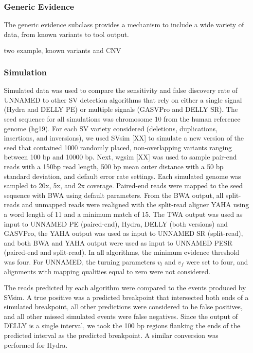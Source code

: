 \documentclass[11pt]{article}
\begin{document}


\subsubsection{Generic Evidence}

The generic evidence subclass provides a mechanism to include a wide variety of
data, from known variants to tool output.

two example, known variants and CNV

\subsubsection{Simulation}

Simulated data was used to compare the sensitivity and false discovery rate of
UNNAMED to other SV detection algorithms that rely on either a single signal
(Hydra and DELLY PE) or multiple signals (GASVPro and DELLY SR).  The seed
sequence for all simulations was chromosome 10 from the human reference genome
(hg19).  For each SV variety considered (deletions, duplications, insertions,
and inversions), we used SVsim [XX] to simulate a new version of the seed that
contained 1000 randomly placed, non-overlapping variants ranging between 100 bp
and 10000 bp. Next, wgsim [XX] was used to sample pair-end reads with a 150bp
read length, 500 bp mean outer distance with a 50 bp standard deviation, and
default error rate settings.  Each simulated genome was sampled to 20x, 5x, and
2x coverage. Paired-end reads were mapped to the seed sequence with BWA using
default parameters.  From the BWA output, all split-reads and unmapped reads
were realigned with the split-read aligner YAHA using a word length of 11 and a
minimum match of 15. The TWA output was used as input to UNNAMED PE
(paired-end), Hydra, DELLY (both versions) and GASVPro, the YAHA output was used
as input to UNNAMED SR (split-read), and both BWA and YAHA output were used as
input to UNNAMED PESR (paired-end and split-read).  In all algorithms, the
minimum evidence threshold was four.  For UNNAMED, the turning parameters $v_l$
and $v_f$ were set to four, and alignments with mapping qualities equal to zero
were not considered.

The reads predicted by each algorithm were compared to the events produced by
SVsim.  A true positive was a predicted breakpoint that intersected both ends of
a simulated breakpoint, all other predictions were considered to be false
positives, and all other missed simulated events were false negatives.  Since
the output of DELLY is a single interval, we took the 100 bp regions flanking
the ends of the predicted interval as the predicted breakpoint.  A similar
conversion was performed for Hydra.




\end{document}
